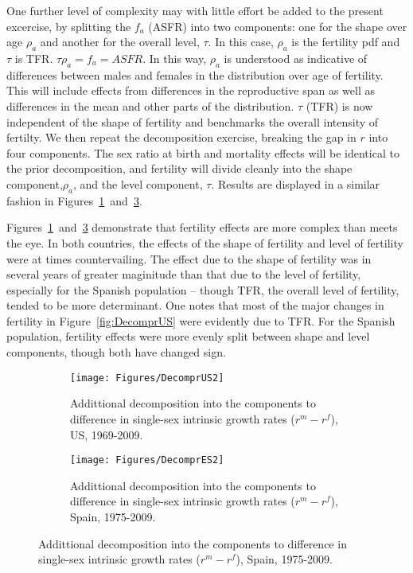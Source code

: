 One further level of complexity may with little effort be added to the present
excercise, by splitting the $f_a$ (ASFR) into two components: one for the shape
over age $\rho _a$ and another for the overall level, $\tau$. In this case, 
$\rho _a$ is the fertility pdf and $\tau$ is TFR. $\tau \rho _a = f_a = ASFR$.
In this way, $\rho _a$ is understood as indicative of differences
between males and females in the distribution over age of fertility. This will
include effects from differences in the reproductive span as well as differences
in the mean and other parts of the distribution. $\tau$ (TFR) is now independent
of the shape of fertility and benchmarks the overall intensity of fertilty. We
then repeat the decomposition exercise, breaking the gap in $r$ into four
components. The sex ratio at birth and mortality effects will be identical to
the prior decomposition, and fertility will divide cleanly into the shape
component,$\rho _a$, and the level component, $\tau$. Results are displayed in a
similar fashion in Figures~\ref{fig:DecomprUS2}~and~\ref{fig:DecomprES2}.

Figures~\ref{fig:DecomprUS2}~and~\ref{fig:DecomprES2} demonstrate that fertility
effects are more complex than meets the eye. In both countries, the effects of
the shape of fertility and level of fertility were at times countervailing. The 
effect due to the shape of fertility was in several years of greater maginitude 
than that due to the level of fertility, especially for the Spanish
population -- though TFR, the overall level of fertility, tended to be more
determinant. One notes that most of the major changes in fertility in
Figure~\ref{fig:DecomprUS} were evidently due to TFR. For the Spanish
population, fertility effects were more evenly split between shape and level components,
though both have changed sign.
\FloatBarrier
\begin{figure}[h!]
        \centering
        \begin{subfigure}
                \centering
                \caption{Addittional decomposition into the components to
                difference in single-sex intrinsic growth rates ($r^m - r^f$), US, 1969-2009.}
                \texttt{[image: Figures/DecomprUS2]}
                \label{fig:DecomprUS2}
        \end{subfigure}
        \begin{subfigure}
                \centering
                \caption{Addittional decomposition into the components to
                difference in single-sex intrinsic growth rates ($r^m - r^f$), Spain, 1975-2009.}
                \texttt{[image: Figures/DecomprES2]}  
                \label{fig:DecomprES2}
        \end{subfigure}
\end{figure}

